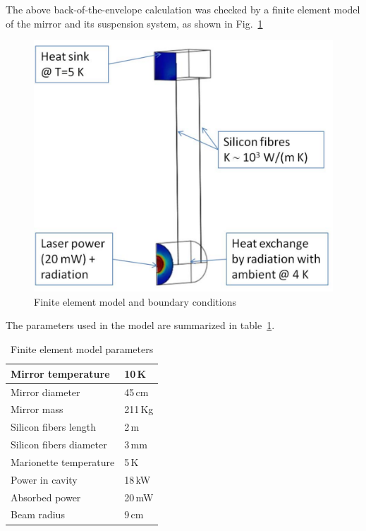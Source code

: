 The above back-of-the-envelope calculation was checked by a finite element model of the mirror and its suspension system, as shown in Fig.~\ref{fig:model}
\begin{figure}[htbp]
\begin{center}
 \includegraphics[width=12cm]{Sec_SiteInfra/Cryotraps/model.pdf}
			\caption{Finite element model and boundary conditions}
\label{fig:model}
\end{center}
\end{figure}
The parameters used in the model are summarized in table~\ref{tab:model-parameters}.
\begin{table}[htbp]
\caption{Finite element model parameters}
\begin{center}
\begin{tabular}{|l|l|}
\hline \rule[-2ex]{0pt}{5.5ex} Mirror temperature & 10\,K \\ 
\hline \rule[-2ex]{0pt}{5.5ex} Mirror diameter & 45\,cm \\ 
\hline \rule[-2ex]{0pt}{5.5ex} Mirror mass & 211\,Kg \\ 
\hline \rule[-2ex]{0pt}{5.5ex} Silicon fibers length & 2\,m \\ 
\hline \rule[-2ex]{0pt}{5.5ex} Silicon fibers diameter & 3\,mm \\ 
\hline \rule[-2ex]{0pt}{5.5ex} Marionette temperature & 5\,K \\ 
\hline \rule[-2ex]{0pt}{5.5ex} Power in cavity & 18\,kW \\ 
\hline \rule[-2ex]{0pt}{5.5ex} Absorbed power  & 20\,mW \\ 
\hline \rule[-2ex]{0pt}{5.5ex} Beam radius & 9\,cm \\ 
\hline 
\end{tabular} 
\end{center}
\label{tab:model-parameters}
\end{table}

